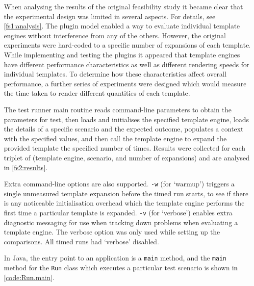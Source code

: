 When analysing the results of the original feasibility study it became clear that the experimental design was limited in several aspects. For details, see \autoref{fs1:analysis}. The plugin model enabled a way to evaluate individual template engines without interference from any of the others. However, the original experiments were hard-coded to a specific number of expansions of each template. While implementing and testing the plugins it appeared that template engines have different performance characteristics as well as different rendering speeds for individual templates. To determine how these characteristics affect overall performance, a further series of experiments were designed which would measure the time taken to render different quantities of each template.

The test runner main routine reads command-line parameters to obtain the parameters for test, then loads and initialises the specified template engine, loads the details of a specific scenario and the expected outcome, populates a context with the specified values, and then call the template engine to expand the provided template the specified number of times. Results were collected for each triplet of (template engine, scenario, and number of expansions) and are analysed in \autoref{fs2:results}.

Extra command-line options are also supported. \verb!-w! (for `warmup') triggers a single unmeasured template expansion before the timed run starts, to see if there is any noticeable initialisation overhead which the template engine performs the first time a particular template is expanded. \verb!-v! (for `verbose') enables extra diagnostic messaging for use when tracking down problems when evaluating a template engine. The verbose option was only used while setting up the comparisons. All timed runs had `verbose' disabled.

In Java, the entry point to an application is a \verb!main! method, and the \verb!main! method for the \verb!Run! class which executes a particular test scenario is shown in \autoref{code:Run.main}.

